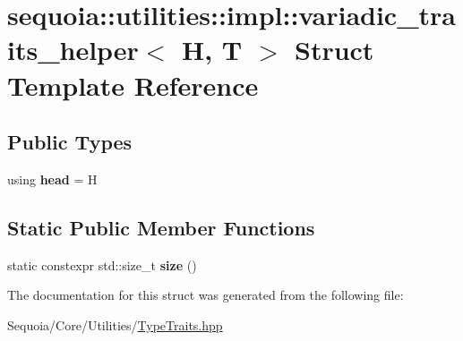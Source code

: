 \hypertarget{structsequoia_1_1utilities_1_1impl_1_1variadic__traits__helper}{}\section{sequoia\+::utilities\+::impl\+::variadic\+\_\+traits\+\_\+helper$<$ H, T $>$ Struct Template Reference}
\label{structsequoia_1_1utilities_1_1impl_1_1variadic__traits__helper}
\subsection*{Public Types}
\begin{DoxyCompactItemize}
\item 
\mbox{\label{structsequoia_1_1utilities_1_1impl_1_1variadic__traits__helper_aa7f61a099b7ab58f23c29f4540a2433c}} 
using {\bfseries head} = H
\end{DoxyCompactItemize}
\subsection*{Static Public Member Functions}
\begin{DoxyCompactItemize}
\item 
\mbox{\label{structsequoia_1_1utilities_1_1impl_1_1variadic__traits__helper_ababd1d51f89b4fb211d353d2cd70d737}} 
static constexpr std\+::size\+\_\+t {\bfseries size} ()
\end{DoxyCompactItemize}


The documentation for this struct was generated from the following file\+:\begin{DoxyCompactItemize}
\item 
Sequoia/\+Core/\+Utilities/\mbox{\hyperlink{_type_traits_8hpp}{Type\+Traits.\+hpp}}\end{DoxyCompactItemize}
